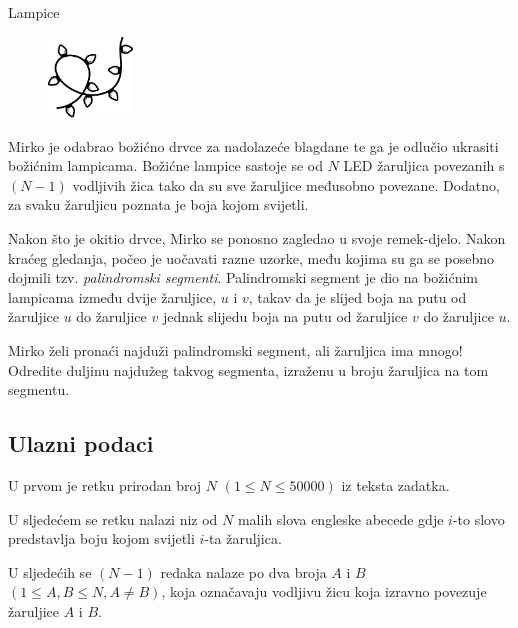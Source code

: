 \begin{statement}[
  problempoints=110,
  timelimit=1 sekunda,
  memorylimit=512 MiB,
]{Lampice}

\setlength\intextsep{-0.1cm}
\begin{figure}
\centering
\includegraphics[width=0.2\textwidth]{img/lampice.png}
\end{figure}

Mirko je odabrao božićno drvce za nadolazeće blagdane te ga je odlučio ukrasiti
božićnim lampicama. Božićne lampice sastoje se od $N$ LED žaruljica povezanih s
$(N - 1)$ vodljivih žica tako da su sve žaruljice međusobno povezane. Dodatno,
za svaku žaruljicu poznata je boja kojom svijetli.

Nakon što je okitio drvce, Mirko se ponosno zagledao u svoje remek-djelo. Nakon
kraćeg gledanja, počeo je uočavati razne uzorke, među kojima su ga se posebno
dojmili tzv. \textit{palindromski segmenti}. Palindromski segment je dio na
božićnim lampicama između dvije žaruljice, $u$ i $v$, takav da je slijed boja na
putu od žaruljice $u$ do žaruljice $v$ jednak slijedu boja na putu od žaruljice
$v$ do žaruljice $u$.

Mirko želi pronaći najduži palindromski segment, ali žaruljica ima mnogo!
Odredite duljinu najdužeg takvog segmenta, izraženu u broju žaruljica na tom
segmentu.

\subsection*{Ulazni podaci}
U prvom je retku prirodan broj $N$ $(1 \le N \le 50 000)$ iz teksta zadatka.

U sljedećem se retku nalazi niz od $N$ malih slova engleske abecede gdje $i$-to
slovo predstavlja boju kojom svijetli $i$-ta žaruljica.

U sljedećih se $(N - 1)$ redaka nalaze po dva broja $A$ i $B$
$(1 \le A, B \le N, A \neq B)$,
koja označavaju vodljivu žicu koja izravno povezuje žaruljice $A$ i $B$.


\end{statement}
